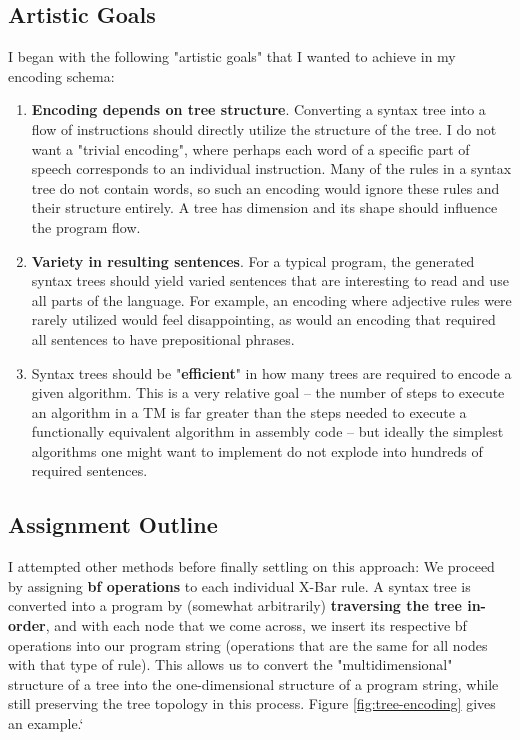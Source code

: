 \documentclass[runningheads]{llncs}
\begin{document}
\subsection{Artistic Goals}
I began with the following "artistic goals" that I wanted to achieve in my encoding schema:
\begin{enumerate}
	\item \textbf{Encoding depends on tree structure}. Converting a syntax tree into a flow of instructions should directly utilize the structure of the tree. I do not want a "trivial encoding", where perhaps each word of a specific part of speech corresponds to an individual instruction. Many of the rules in a syntax tree do not contain words, so such an encoding would ignore these rules and their structure entirely. A tree has dimension and its shape should influence the program flow.%
		\item \textbf{Variety in resulting sentences}. For a typical program, the generated syntax trees should yield varied sentences that are interesting to read and use all parts of the language. For example, an encoding where adjective rules were rarely utilized would feel disappointing, as would an encoding that required all sentences to have prepositional phrases.
		\item Syntax trees should be "\textbf{efficient}" in how many trees are required to encode a given algorithm. This is a very relative goal -- the number of steps to execute an algorithm in a TM is far greater than the steps needed to execute a functionally equivalent algorithm in assembly code -- but ideally the simplest algorithms one might want to implement do not explode into hundreds of required sentences.
\end{enumerate}
\subsection{Assignment Outline}
I attempted other methods before finally settling on this approach: We proceed by assigning \textbf{bf operations} to each individual X-Bar rule. A syntax tree is converted into a program by (somewhat arbitrarily) \textbf{traversing the tree in-order}, and with each node that we come across, we insert its respective bf operations into our program string (operations that are the same for all nodes with that type of rule). This allows us to convert the "multidimensional" structure of a tree into the one-dimensional structure of a program string, while still preserving the tree topology in this process. Figure \ref{fig:tree-encoding} gives an example.`
\end{document}
